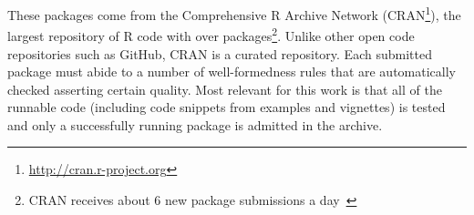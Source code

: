 \documentclass[conference]{IEEEtran}
\begin{document}
These packages come from the Comprehensive R Archive Network
(CRAN\footnote{\url{http://cran.r-project.org}}), the largest repository of R
code with over \CorpusAllCranRnd packages\footnote{CRAN receives about 6 new
  package submissions a day~\cite{Ligges2017}}. Unlike other open code
repositories such as GitHub, CRAN is a curated repository. Each submitted
package must abide to a number of well-formedness rules that are automatically
checked asserting certain quality. Most relevant for this work is that all of
the runnable code (including code snippets from examples and vignettes) is
tested and only a successfully running package is admitted in the archive.


\end{document}
